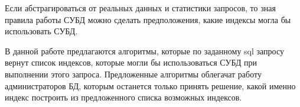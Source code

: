 Если абстрагироваться от реальных данных и статистики запросов, то зная правила работы СУБД можно сделать предположения, какие индексы могла бы использовать СУБД. 

В данной работе предлагаются алгоритмы, которые по заданному sql запросу вернут список индексов, которые могли бы использоваться СУБД при выполнении этого запроса. Предложенные алгоритмы облегачат работу администраторов БД, которым останется только принять решение, какой именно индекс построить из предложенного списка возможных индексов.





